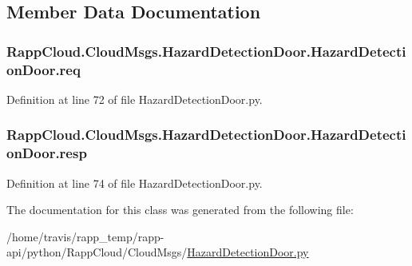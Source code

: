 \subsection{Member Data Documentation}
\hypertarget{classRappCloud_1_1CloudMsgs_1_1HazardDetectionDoor_1_1HazardDetectionDoor_a26d6d2aecaa94fe2ae22c1d373177fa7}{
\subsubsection[{req}]{\setlength{\rightskip}{0pt plus 5cm}Rapp\-Cloud.\-Cloud\-Msgs.\-Hazard\-Detection\-Door.\-Hazard\-Detection\-Door.\-req}}\label{classRappCloud_1_1CloudMsgs_1_1HazardDetectionDoor_1_1HazardDetectionDoor_a26d6d2aecaa94fe2ae22c1d373177fa7}


Definition at line 72 of file Hazard\-Detection\-Door.\-py.

\hypertarget{classRappCloud_1_1CloudMsgs_1_1HazardDetectionDoor_1_1HazardDetectionDoor_ab839feeefa52db8d1fbc0784fd457ac5}{
\subsubsection[{resp}]{\setlength{\rightskip}{0pt plus 5cm}Rapp\-Cloud.\-Cloud\-Msgs.\-Hazard\-Detection\-Door.\-Hazard\-Detection\-Door.\-resp}}\label{classRappCloud_1_1CloudMsgs_1_1HazardDetectionDoor_1_1HazardDetectionDoor_ab839feeefa52db8d1fbc0784fd457ac5}


Definition at line 74 of file Hazard\-Detection\-Door.\-py.



The documentation for this class was generated from the following file\-:\begin{DoxyCompactItemize}
\item 
/home/travis/rapp\-\_\-temp/rapp-\/api/python/\-Rapp\-Cloud/\-Cloud\-Msgs/\hyperlink{HazardDetectionDoor_8py}{Hazard\-Detection\-Door.\-py}\end{DoxyCompactItemize}

